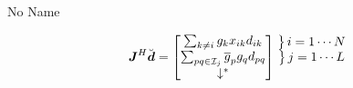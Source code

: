 \documentclass[a4paper,10pt]{article}
\newcommand{\conj}[1]{\overline{#1}}
\newcommand\coolover[2]{\mathrlap{\smash{\overbrace{\phantom{%
    \begin{matrix} #2 \end{matrix}}}^{\mbox{$#1$}}}}#2}
\newcommand\coolunder[2]{\mathrlap{\smash{\underbrace{\phantom{%
    \begin{matrix} #2 \end{matrix}}}_{\mbox{$#1$}}}}#2}
\newcommand\coolleftbrace[2]{%
#1\left\{\vphantom{\begin{matrix} #2 \end{matrix}}\right.}
\newcommand\coolrightbrace[2]{%
\left.\vphantom{\begin{matrix} #1 \end{matrix}}\right\}#2}
\begin{document}
\begin{section}{No Name}

\begin{equation}
\boldsymbol{J}^H\breve{\boldsymbol{d}} = 
\begin{bmatrix}
\sum_{k\neq i } g_k x_{ik}d_{ik}\\
\sum_{pq \in \mathcal{I}_j} \conj{g}_p g_q d_{pq}\\
\downarrow^{*}
\end{bmatrix}
\begin{matrix}%
\coolrightbrace{\sum g_k x_{\zeta_{ik}}d_{ik}}{i = 1\cdots N}\\
\coolrightbrace{\sum \conj{g}_p g_q d_{pq}}{j = 1\cdots L}\\
\vphantom{\downarrow^{*}}
\end{matrix}
\end{equation}


\end{section}
\end{document}
